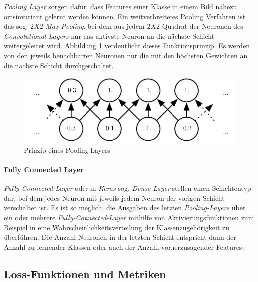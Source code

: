 \textit{Pooling Layer} sorgen dafür, dass Features einer Klasse in einem Bild nahezu ortsinvariant gelernt werden können. Ein weitverbreitetes Pooling Verfahren ist das sog. $2X2$ \textit{Max-Pooling}, bei dem aus jedem $2X2$ Quadrat der Neuronen des \textit{Convolutional-Layers} nur das aktivste Neuron an die nächste Schicht weitergeleitet wird. Abbildung \ref{poolinglayer} verdeutlicht dieses Funktionsprinzip. Es werden von den jeweils benachbarten Neuronen nur die mit den höchsten Gewichten an die nächste Schicht durchgeschaltet.
\begin{figure}[!h]
  \centering
  \includegraphics[width=12cm]{pooling_layer.png}
  \caption{Prinzip eines Pooling Layers \cite[S.337]{Goodfellow-et-al-2016}}
  \label{poolinglayer}
\end{figure} 
\FloatBarrier

\paragraph{Fully Connected Layer}

\textit{Fully-Connected-Layer} oder in \textit{Keras} sog. \textit{Dense-Layer} stellen einen Schichtentyp dar, bei dem jedes Neuron mit jeweils jedem Neuron der vorigen Schicht verschaltet ist. Es ist so möglich, die Ausgaben des letzten \textit{Pooling-Layers} über ein oder mehrere \textit{Fully-Connected-Layer} mithilfe von Aktivierungsfunktionen zum Beispiel in eine Wahrscheinlichkeitsverteilung der Klassenzugehörigkeit zu überführen. Die Anzahl Neuronen in der letzten Schicht entspricht dann der Anzahl zu lernender Klassen oder auch der Anzahl vorherzusagender Features.

\subsection{Loss-Funktionen und Metriken}

